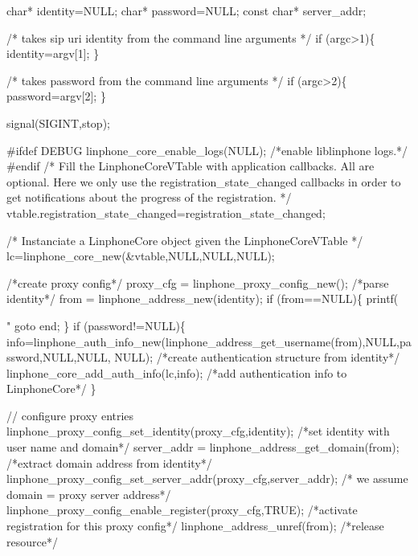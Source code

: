 \begin{DoxyCodeInclude}
{        \textcolor{keywordtype}{char}* identity=NULL;
        \textcolor{keywordtype}{char}* password=NULL;
        \textcolor{keyword}{const} \textcolor{keywordtype}{char}* server\_addr;

        \textcolor{comment}{/* takes   sip uri  identity from the command line arguments */}
        \textcolor{keywordflow}{if} (argc>1)\{
                identity=argv[1];
        \}

        \textcolor{comment}{/* takes   password from the command line arguments */}
        \textcolor{keywordflow}{if} (argc>2)\{
                password=argv[2];
        \}

        signal(SIGINT,stop);

\textcolor{preprocessor}{#ifdef DEBUG}
        linphone_core_enable_logs(NULL); \textcolor{comment}{/*enable liblinphone logs.*/}
\textcolor{preprocessor}{#endif}
        \textcolor{comment}{/*}
\textcolor{comment}{         Fill the LinphoneCoreVTable with application callbacks.}
\textcolor{comment}{         All are optional. Here we only use the registration\_state\_changed callbacks}
\textcolor{comment}{         in order to get notifications about the progress of the registration.}
\textcolor{comment}{         */}
        vtable.registration_state_changed=registration\_state\_changed;

        \textcolor{comment}{/*}
\textcolor{comment}{         Instanciate a LinphoneCore object given the LinphoneCoreVTable}
\textcolor{comment}{        */}
        lc=linphone_core_new(&vtable,NULL,NULL,NULL);

        \textcolor{comment}{/*create proxy config*/}
        proxy\_cfg = linphone_proxy_config_new();
        \textcolor{comment}{/*parse identity*/}
        from = linphone_address_new(identity);
        \textcolor{keywordflow}{if} (from==NULL)\{
                printf(\textcolor{stringliteral}{"%
                \textcolor{keywordflow}{goto} end;
        \}
        \textcolor{keywordflow}{if} (password!=NULL)\{
                info=linphone_auth_info_new(linphone_address_get_username(from),NULL,password,NULL,NULL,
      NULL); \textcolor{comment}{/*create authentication structure from identity*/}
                linphone_core_add_auth_info(lc,info); \textcolor{comment}{/*add authentication info to LinphoneCore*/}
        \}

        \textcolor{comment}{// configure proxy entries}
        linphone_proxy_config_set_identity(proxy\_cfg,identity); \textcolor{comment}{/*set identity with user name and domain*/}
        server\_addr = linphone_address_get_domain(from); \textcolor{comment}{/*extract domain address from identity*/}
        linphone_proxy_config_set_server_addr(proxy\_cfg,server\_addr); \textcolor{comment}{/* we assume domain = proxy server
       address*/}
        linphone_proxy_config_enable_register(proxy\_cfg,TRUE); \textcolor{comment}{/*activate registration for this proxy
       config*/}
        linphone_address_unref(from); \textcolor{comment}{/*release resource*/}

}}
\end{DoxyCodeInclude}

